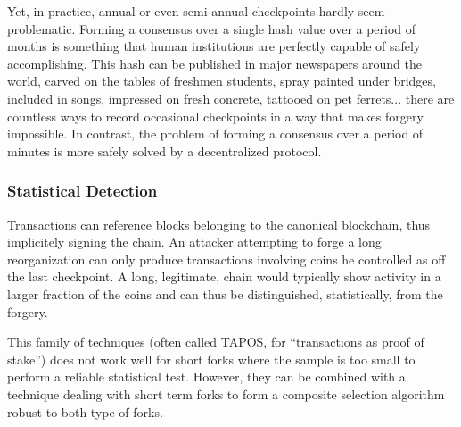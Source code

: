 \documentclass[letterpaper]{article}
\begin{document}
Yet, in practice, annual or even semi-annual checkpoints hardly seem problematic.
Forming a consensus over a single hash value over a period of months is
something that human institutions are perfectly capable of safely accomplishing.
This hash can be published in major newspapers around the world,
carved on the tables of freshmen students, spray painted under bridges,
included in songs, impressed on fresh concrete, tattooed on pet ferrets...
there are countless ways to record occasional checkpoints
in a way that makes forgery impossible.
In contrast, the problem of forming a consensus over a period of minutes
is more safely solved by a decentralized protocol.

\subsubsection{Statistical Detection}
Transactions can reference blocks belonging to the canonical blockchain,
thus implicitely signing the chain. An attacker attempting to forge a 
long reorganization can only produce transactions involving coins he
controlled as off the last checkpoint. A long, legitimate, chain would
typically show activity in a larger fraction of the coins and can thus
be distinguished, statistically, from the forgery.

This family of techniques (often called TAPOS, for
``transactions as proof of stake'') does not work well for short forks where the sample
is too small to perform a reliable statistical test. However, they can be combined
with a technique dealing with short term forks to form a composite selection
algorithm robust to both type of forks.

\end{document}
